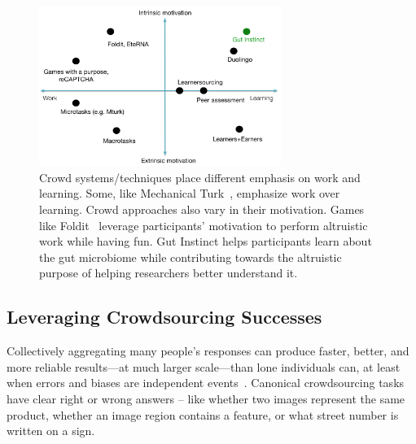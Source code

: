 
\begin{figure}[h]
  \centering
  \includegraphics[width=0.7\textwidth]{figures/gutinstinct/gi-2.png}
  \caption[Crowd systems/techniques place different emphasis on
work and learning]
{Crowd systems/techniques place different emphasis on
work and learning. Some, like Mechanical Turk~\cite{Amazon2016}, emphasize
work over learning. Crowd approaches also vary in their motivation.
Games like Foldit~\cite{Cooper2010} leverage participants’ motivation
to perform altruistic work while having fun. Gut Instinct helps
participants learn about the gut microbiome while contributing
towards the altruistic purpose of helping researchers better
understand it.    }
  \label{fig:gi-2}
\end{figure}


\subsection{Leveraging Crowdsourcing Successes}
Collectively aggregating many people’s responses can produce faster, better, and more reliable results---at much larger scale---than lone individuals can, at least when errors and biases are independent events~\cite{Surowiecki2005}. Canonical crowdsourcing tasks have clear right or wrong answers – like whether two images represent the same product, whether an image region contains a feature, or what street number is written on a sign.

